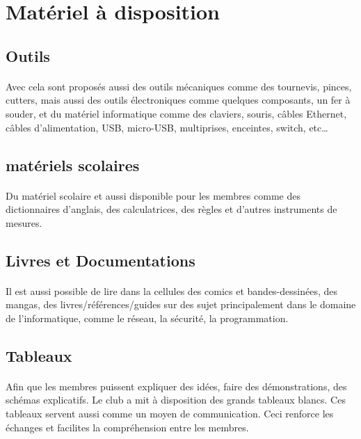 \documentclass[11pt]{report}
\begin{document}
\section{Matériel à disposition}
\subsection{Outils}
\paragraph{} Avec cela sont proposés aussi des outils mécaniques comme des
tournevis, pinces, cutters, mais aussi des outils électroniques comme quelques
composants, un fer à souder, et du matériel informatique comme des claviers,
souris, câbles Ethernet, câbles d'alimentation, USB, micro-USB, multiprises,
enceintes, switch, etc\ldots


\subsection{matériels scolaires}

\paragraph{} Du matériel scolaire et aussi disponible pour les membres comme
des dictionnaires d'anglais, des calculatrices, des règles et d'autres
instruments de mesures.

\subsection{Livres et Documentations}
\paragraph{} Il est aussi possible de lire dans la cellules des comics et
bandes-dessinées, des mangas, des livres/références/guides sur des sujet
principalement dans le domaine de l'informatique, comme le réseau, la sécurité,
la programmation.

\subsection{Tableaux}
\paragraph{} Afin que les membres puissent expliquer des idées, faire des
démonstrations, des schémas explicatifs. Le club a mit à disposition des grands
tableaux blancs. Ces tableaux servent aussi comme un moyen de communication.
Ceci renforce les échanges et facilites la compréhension entre les membres.
\end{document}
